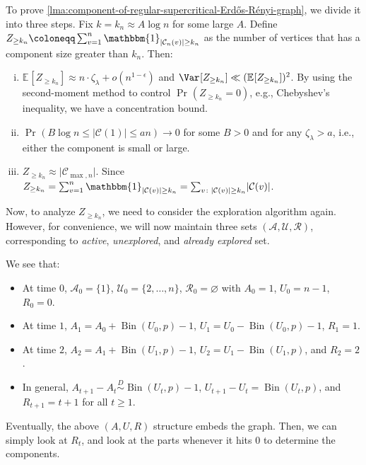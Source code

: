 To prove \autoref{lma:component-of-regular-supercritical-Erdős-Rényi-graph}, we divide it into three steps. Fix \(k = k_n \approx A \log n\) for some large \(A\). Define \(Z_{\geq k_n} \coloneqq \sum_{v=1}^{n} \mathbbm{1}_{\lvert \mathcal{C} _n(v) \rvert \geq k_n} \) as the number of vertices that has a component size greater than \(k_n\). Then:
\begin{enumerate}[(i)]
	\item \(\mathbb{E}_{}[Z_{\geq k_n}] \approx n \cdot \zeta _\lambda + o(n^{1 - \epsilon })\) and \(\Var_{}[Z_{\geq k_n}] \ll (\mathbb{E}_{}[Z_{\geq k_n}] )^2\). By using the second-moment method to control \(\Pr_{}(Z_{\geq k_n} = 0) \), e.g., Chebyshev's inequality, we have a concentration bound.
	\item \(\Pr_{}(B \log n \leq \lvert \mathcal{C} (1) \rvert \leq a n) \to 0\) for some \(B > 0\) and for any \(\zeta _\lambda > a\), i.e., either the component is small or large.
	\item \(Z_{\geq k_n} \approx \lvert \mathcal{C} _{\max , n} \rvert \). Since \(Z_{\geq k_n} = \sum_{v=1}^{n} \mathbbm{1}_{\lvert \mathcal{C} (v) \rvert \geq k_n} = \sum_{v \colon \lvert \mathcal{C} (v) \rvert \geq k_n } \lvert \mathcal{C} (v) \rvert \).
\end{enumerate}

Now, to analyze \(Z_{\geq k_n}\), we need to consider the exploration algorithm again. However, for convenience, we will now maintain three sets \((\mathcal{A} , \mathcal{U} , \mathcal{R} )\), corresponding to \emph{active}, \emph{unexplored}, and \emph{already explored} set.

\begin{intuition}
	We see that:
	\begin{itemize}
		\item At time \(0\), \(\mathcal{A} _0 = \{ 1 \} \), \(\mathcal{U} _0 = \{ 2, \dots , n \} \), \(\mathcal{R} _0 = \varnothing \) with \(A_0 = 1\), \(U_0 = n-1\), \(R_0 = 0\).
		\item At time \(1\), \(A_1 = A_0 + \operatorname{Bin}(U_0, p) - 1\), \(U_1 = U_0 - \operatorname{Bin}(U_0, p) - 1\), \(R_1 = 1\).
		\item At time \(2\), \(A_2 = A_1 + \operatorname{Bin}(U_1, p) - 1\), \(U_2 = U_1 - \operatorname{Bin}(U_1, p) \), and \(R_2 = 2\).
		\item In general, \(A_{t+1} - A_t \overset{D}{\sim } \operatorname{Bin}(U_t, p) - 1 \), \(U_{t+1} - U_t = \operatorname{Bin}(U_t, p) \), and \(R_{t+1} = t+1\) for all \(t \geq 1\).
	\end{itemize}
	Eventually, the above \((A, U, R)\) structure embeds the graph. Then, we can simply look at \(R_t\), and look at the parts whenever it hits \(0\) to determine the components.
\end{intuition}